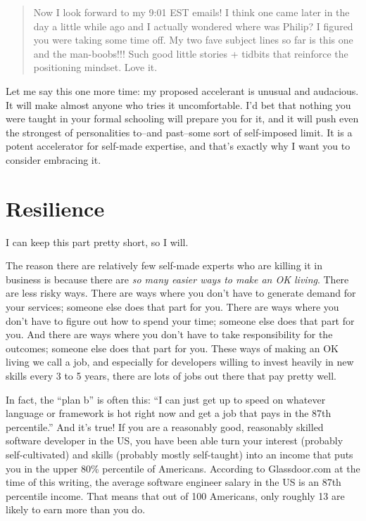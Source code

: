 \begin{quote}
Now I look forward to my 9:01 EST emails!  I think one came later in the day a little while ago and I actually wondered where was Philip?  I figured you were taking some time off. My two fave subject lines so far is this one and the man-boobs!!!  Such good little stories + tidbits that reinforce the positioning mindset.  Love it.
\end{quote}

Let me say this one more time: my proposed accelerant is unusual and audacious. It will make almost anyone who tries it uncomfortable. I'd bet that nothing you were taught in your formal schooling will prepare you for it, and it will push even the strongest of personalities to--and past--some sort of self-imposed limit. It is a potent accelerator for self-made expertise, and that's exactly why I want you to consider embracing it.

\section{Resilience}

I can keep this part pretty short, so I will.

The reason there are relatively few self-made experts who are killing it in business is because there are \emph{so many easier ways to make an OK living}. There are less risky ways. There are ways where you don't have to generate demand for your services; someone else does that part for you. There are ways where you don't have to figure out how to spend your time; someone else does that part for you. And there are ways where you don't have to take responsibility for the outcomes; someone else does that part for you. These ways of making an OK living we call a job, and especially for developers willing to invest heavily in new skills every 3 to 5 years, there are lots of jobs out there that pay pretty well.

In fact, the ``plan b'' is often this: ``I can just get up to speed on whatever language or framework is hot right now and get a job that pays in the 87th percentile.'' And it's true! If you are a reasonably good, reasonably skilled software developer in the US, you have been able turn your interest (probably self-cultivated) and skills (probably mostly self-taught) into an income that puts you in the upper 80\% percentile of Americans. According to Glassdoor.com at the time of this writing, the average software engineer salary in the US is an 87th percentile income. That means that out of 100 Americans, only roughly 13 are likely to earn more than you do.

